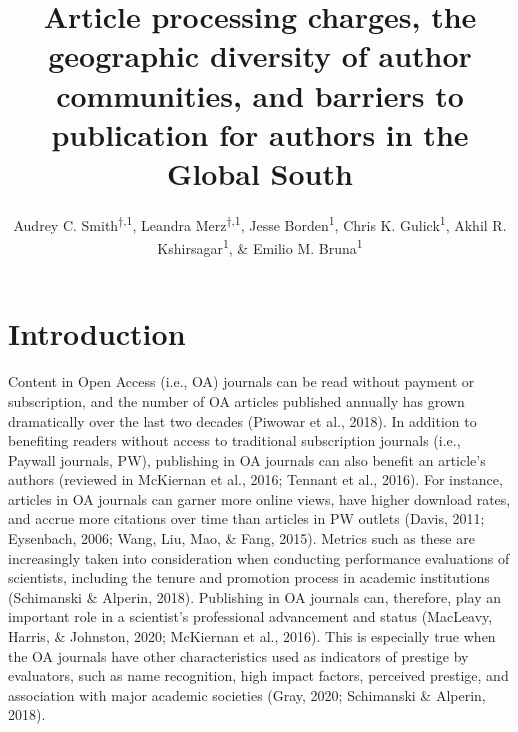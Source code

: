 \documentclass[
  english,
  man]{apa6}
\title{Article processing charges, the geographic diversity of author communities, and barriers to publication for authors in the Global South}
\author{Audrey C. Smith\textsuperscript{$\dagger{}$,1}, Leandra Merz\textsuperscript{$\dagger{}$,1}, Jesse Borden\textsuperscript{1}, Chris K. Gulick\textsuperscript{1}, Akhil R. Kshirsagar\textsuperscript{1}, \& Emilio M. Bruna\textsuperscript{1}}
\date{}
\affiliation{\vspace{0.5cm}\textsuperscript{1} University of Florida}
\begin{document}
\maketitle

\hypertarget{introduction}{%
\section{Introduction}\label{introduction}}

Content in Open Access (i.e., OA) journals can be read without payment or subscription, and the number of OA articles published annually has grown dramatically over the last two decades (Piwowar et al., 2018). In addition to benefiting readers without access to traditional subscription journals (i.e., Paywall journals, PW), publishing in OA journals can also benefit an article's authors (reviewed in McKiernan et al., 2016; Tennant et al., 2016). For instance, articles in OA journals can garner more online views, have higher download rates, and accrue more citations over time than articles in PW outlets (Davis, 2011; Eysenbach, 2006; Wang, Liu, Mao, \& Fang, 2015). Metrics such as these are increasingly taken into consideration when conducting performance evaluations of scientists, including the tenure and promotion process in academic institutions (Schimanski \& Alperin, 2018). Publishing in OA journals can, therefore, play an important role in a scientist's professional advancement and status (MacLeavy, Harris, \& Johnston, 2020; McKiernan et al., 2016). This is especially true when the OA journals have other characteristics used as indicators of prestige by evaluators, such as name recognition, high impact factors, perceived prestige, and association with major academic societies (Gray, 2020; Schimanski \& Alperin, 2018).\\
\end{document}
